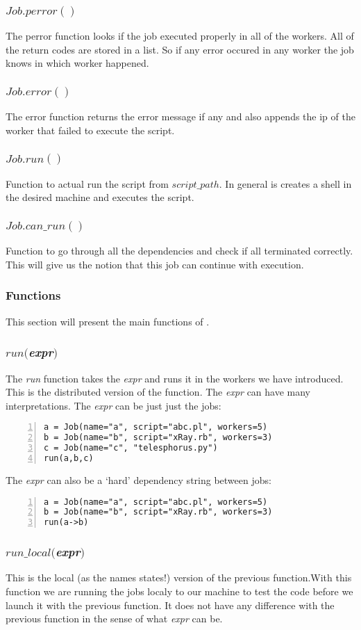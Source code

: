 \subsubsection*{$Job.perror()$}
The perror function looks if the job executed properly in all of the workers. All of the return codes are stored in a list. So if any error occured in any worker the job knows in which worker happened.
\subsubsection*{$Job.error()$}
The error function returns the error message if any and also appends the ip of the worker that failed to execute the script.
\subsubsection*{$Job.run()$}
Function to actual run the script from $script\_path$. In general is creates a shell in the desired machine
and executes the script.
\subsubsection*{$Job.can\_run()$}
Function to go through all the dependencies and check if all terminated correctly. This will give us the notion
that this job can continue with execution.

\subsubsection*{Functions}

This section will present the main functions of \lang{}.
\subsubsection*{$run($\textit{expr}$)$}
The \textit{run} function takes the \textit{expr} and runs it in the workers we have introduced.
This is the distributed version of the function.
The \textit{expr} can have many interpretations. The \textit{expr} can be just just the jobs:
\begin{Verbatim}[numbers=left]
a = Job(name="a", script="abc.pl", workers=5)
b = Job(name="b", script="xRay.rb", workers=3)
c = Job(name="c", "telesphorus.py")
run(a,b,c)
\end{Verbatim}
The \textit{expr} can also be a `hard' dependency string between jobs:
\begin{Verbatim}[numbers=left]
a = Job(name="a", script="abc.pl", workers=5)
b = Job(name="b", script="xRay.rb", workers=3)
run(a->b)
\end{Verbatim}
\subsubsection*{$run\_local($\textit{expr}$)$}
This is the local (as the names states!) version of the previous function.With this function we are running the jobs localy to our machine to test the code before we launch it with the previous function. It does not have any difference with the previous function in the sense of what \textit{expr} can be.
